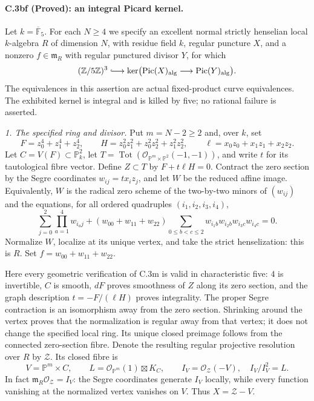 \paragraph{C.3bf (Proved): an integral Picard kernel.}
Let $k=\overline{\mathbb F}_5$. For each $N\ge4$ we specify an
excellent normal strictly henselian local $k$-algebra $R$ of dimension
$N$, with residue field $k$, regular puncture $X$, and a nonzero
$f\in\mathfrak m_R$ with regular punctured divisor $Y$, for which
\[
 (\mathbb Z/5\mathbb Z)^3
 \lhook\joinrel\longrightarrow
 \ker\bigl(\operatorname{Pic}(X)_{\rm alg}
                  \longrightarrow\operatorname{Pic}(Y)_{\rm alg}\bigr).
\]
The equivalences in this assertion are actual fixed-product curve
equivalences. The exhibited kernel is integral and is killed by five;
no rational failure is asserted.

\emph{1. The specified ring and divisor.}
Put $m=N-2\ge2$ and, over $k$, set
\[
 F=z_0^4+z_1^4+z_2^4,\qquad
 H=z_0^2z_1^2+z_0^2z_2^2+z_1^2z_2^2,\qquad
 \ell=x_0z_0+x_1z_1+x_2z_2.
\]
Let $C=V(F)\subset\mathbb P^2_k$, let
$T=\operatorname{Tot}(\mathcal O_{\mathbb P^m\times\mathbb P^2}(-1,-1))$,
and write $t$ for its tautological fibre vector. Define
$Z\subset T$ by $F+t\ell H=0$. Contract the zero section by the
Segre coordinates $w_{ij}=tx_i z_j$, and let $W$ be the reduced affine
image. Equivalently, $W$ is the radical zero scheme of the two-by-two
minors of $(w_{ij})$ and the equations, for all ordered quadruples
$(i_1,i_2,i_3,i_4)$,
\[
 \sum_{j=0}^2\prod_{a=1}^4w_{i_a j}
 +(w_{00}+w_{11}+w_{22})
       \sum_{0\le b<c\le2}w_{i_1b}w_{i_2b}w_{i_3c}w_{i_4c}=0.
\]
Normalize $W$, localize at its unique vertex, and take the strict
henselization: this is $R$. Set $f=w_{00}+w_{11}+w_{22}$.

Here every geometric verification of C.3m is valid in characteristic
five: $4$ is invertible, $C$ is smooth, $dF$ proves smoothness of $Z$
along its zero section, and the graph description $t=-F/(\ell H)$
proves integrality. The proper Segre contraction is an isomorphism
away from the zero section. Shrinking around the vertex proves that
the normalization is regular away from that vertex; it does not
change the specified local ring. Its unique closed preimage follows
from the connected zero-section fibre. Denote the resulting regular
projective resolution over $R$ by $\mathcal Z$. Its closed fibre is
\[
 V=\mathbb P^m\times C,\qquad
 L=\mathcal O_{\mathbb P^m}(1)\boxtimes K_C,
 \qquad I_V=\mathcal O_{\mathcal Z}(-V),\quad I_V/I_V^2=L.
\]
In fact $\mathfrak m_R\mathcal O_{\mathcal Z}=I_V$: the Segre
coordinates generate $I_V$ locally, while every function vanishing
at the normalized vertex vanishes on $V$. Thus $X=\mathcal Z-V$.

